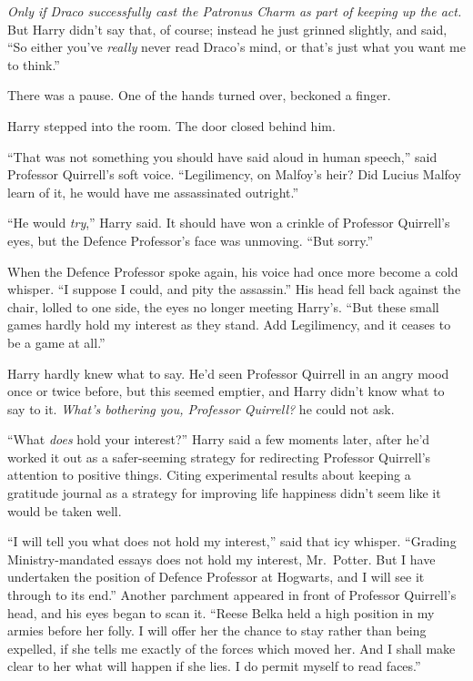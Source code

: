 \emph{Only if Draco successfully cast the Patronus Charm as part of
keeping up the act.} But Harry didn't say that, of course; instead he
just grinned slightly, and said, ``So either you've \emph{really} never
read Draco's mind, or that's just what you want me to think.''

There was a pause. One of the hands turned over, beckoned a finger.

Harry stepped into the room. The door closed behind him.

``That was not something you should have said aloud in human speech,''
said Professor Quirrell's soft voice. ``Legilimency, on Malfoy's heir?
Did Lucius Malfoy learn of it, he would have me assassinated outright.''

``He would \emph{try},'' Harry said. It should have won a crinkle of
Professor Quirrell's eyes, but the Defence Professor's face was
unmoving. ``But sorry.''

When the Defence Professor spoke again, his voice had once more become a
cold whisper. ``I suppose I could, and pity the assassin.'' His head
fell back against the chair, lolled to one side, the eyes no longer
meeting Harry's. ``But these small games hardly hold my interest as they
stand. Add Legilimency, and it ceases to be a game at all.''

Harry hardly knew what to say. He'd seen Professor Quirrell in an angry
mood once or twice before, but this seemed emptier, and Harry didn't
know what to say to it. \emph{What's bothering you, Professor Quirrell?}
he could not ask.

``What \emph{does} hold your interest?'' Harry said a few moments later,
after he'd worked it out as a safer-seeming strategy for redirecting
Professor Quirrell's attention to positive things. Citing experimental
results about keeping a gratitude journal as a strategy for improving
life happiness didn't seem like it would be taken well.

``I will tell you what does not hold my interest,'' said that icy
whisper. ``Grading Ministry-mandated essays does not hold my interest,
Mr.~Potter. But I have undertaken the position of Defence Professor at
Hogwarts, and I will see it through to its end.'' Another parchment
appeared in front of Professor Quirrell's head, and his eyes began to
scan it. ``Reese Belka held a high position in my armies before her
folly. I will offer her the chance to stay rather than being expelled,
if she tells me exactly of the forces which moved her. And I shall make
clear to her what will happen if she lies. I do permit myself to read
faces.''


